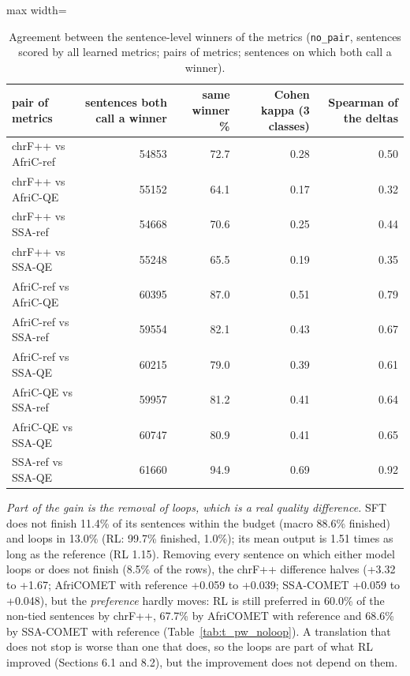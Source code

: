 \begin{table}[t]
\centering
\footnotesize
\setlength{\tabcolsep}{3pt}
\caption{Agreement between the sentence-level winners of the metrics (\texttt{no\_pair}, sentences scored by all learned metrics; pairs of metrics; sentences on which both call a winner).}
\label{tab:t_pw_agree}
\begin{adjustbox}{max width=\linewidth}
{\def\LTcaptype{none} %
\begin{tabular}{@{}lrrrr@{}}
\toprule
pair of metrics & sentences both call a winner & same winner \% & Cohen kappa (3 classes) & Spearman of the deltas \\
\midrule
chrF++ vs AfriC-ref & 54853 & 72.7 & 0.28 & 0.50 \\
chrF++ vs AfriC-QE & 55152 & 64.1 & 0.17 & 0.32 \\
chrF++ vs SSA-ref & 54668 & 70.6 & 0.25 & 0.44 \\
chrF++ vs SSA-QE & 55248 & 65.5 & 0.19 & 0.35 \\
AfriC-ref vs AfriC-QE & 60395 & 87.0 & 0.51 & 0.79 \\
AfriC-ref vs SSA-ref & 59554 & 82.1 & 0.43 & 0.67 \\
AfriC-ref vs SSA-QE & 60215 & 79.0 & 0.39 & 0.61 \\
AfriC-QE vs SSA-ref & 59957 & 81.2 & 0.41 & 0.64 \\
AfriC-QE vs SSA-QE & 60747 & 80.9 & 0.41 & 0.65 \\
SSA-ref vs SSA-QE & 61660 & 94.9 & 0.69 & 0.92 \\
\bottomrule
\end{tabular}
}
\end{adjustbox}
\end{table}

\emph{Part of the gain is the removal of loops, which is a real quality difference.} SFT does not finish 11.4\% of its sentences within the budget (macro 88.6\% finished) and loops in 13.0\% (RL: 99.7\% finished, 1.0\%); its mean output is 1.51 times as long as the reference (RL 1.15). Removing every sentence on which either model loops or does not finish (8.5\% of the rows), the chrF++ difference halves (+3.32 to +1.67; AfriCOMET with reference +0.059 to +0.039; SSA-COMET +0.059 to +0.048), but the \emph{preference} hardly moves: RL is still preferred in 60.0\% of the non-tied sentences by chrF++, 67.7\% by AfriCOMET with reference and 68.6\% by SSA-COMET with reference (Table~\ref{tab:t_pw_noloop}). A translation that does not stop is worse than one that does, so the loops are part of what RL improved (Sections 6.1 and 8.2), but the improvement does not depend on them.

